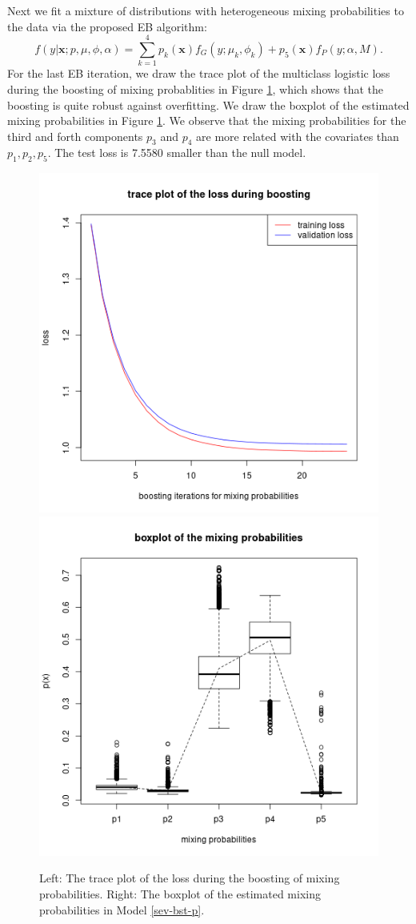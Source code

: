 \documentclass[11pt]{article}
\numberwithin{equation}{section}
\def\bx{\boldsymbol{x}}
\begin{document}
Next we fit a mixture of distributions with heterogeneous mixing probabilities to the data via the proposed EB algorithm:
\begin{equation}\label{sev-bst-p}
f(y|\bx;p,\mu,\phi,\alpha)=\sum_{k=1}^4p_k(\bx)f_{G}(y;\mu_k,\phi_k)+p_5(\bx)f_{P}(y;\alpha,M).
\end{equation}
For the last EB iteration, we draw the trace plot of the multiclass logistic loss during the boosting of mixing probablities in Figure \ref{bx-bst-p}, which shows that the boosting is quite robust against overfitting.
We draw the boxplot of the estimated mixing probabilities in Figure \ref{bx-bst-p}.
We observe that the mixing probabilities for the third and forth components $p_3$ and $p_4$ are more related with the covariates than $p_1,p_2,p_5$.
The test loss is  7.5580 smaller than the null model.
	\begin{figure}[htp!]
		\centering
				\includegraphics[width=0.4\linewidth]{../plots/sev/bst_p_trace}
		\includegraphics[width=0.4\linewidth]{../plots/sev/bst_p}
		\caption{Left: The trace plot of the loss during the boosting of mixing probabilities. Right: The boxplot of the estimated mixing probabilities in Model \eqref{sev-bst-p}.}\label{bx-bst-p}
	\end{figure}
\end{document}
